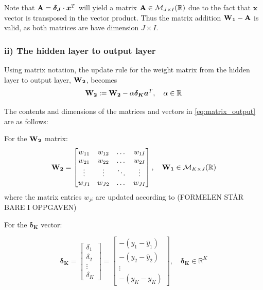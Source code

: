 \documentclass{article}
\begin{document}
Note that $\text{\textbf{A}} = \boldsymbol{\delta_J} \cdot \boldsymbol{x}^T$ will yield a matrix $\text{\textbf{A}} \in \mathcal{M}_{J \times I}(\mathbb{R})$ due to the fact that $\boldsymbol{x}$ vector is transposed in the vector product. Thus the matrix addition $\text{\textbf{W}}_\textbf{1} - \text{\textbf{A}}$ is valid, as both matrices are have dimension $J \times I$.  


\subsubsection*{ii) The hidden layer to output layer} 
Using matrix notation, the update rule for the weight matrix from the hidden layer to output layer, $\text{\textbf{W}}_\textbf{2}$, becomes 
\begin{equation}
    \text{\textbf{W}}_\textbf{2} := \text{\textbf{W}}_\textbf{2} - \alpha \boldsymbol{\delta_K} \boldsymbol{a}^T,\quad \alpha \in \mathbb{R}
    \label{eq:matrix_output}
\end{equation}

The contents and dimensions of the matrices and vectors in \eqref{eq:matrix_output} are as follows: 


For the $\text{\textbf{W}}_\textbf{2}$ matrix:
\begin{equation}
    \text{\textbf{W}}_\textbf{2} =
    \begin{bmatrix}
        w_{11} & w_{12}& \dots & w_{1I} \\
         w_{21} & w_{22}& \dots & w_{2I} \\
        \vdots & \vdots & \ddots & \vdots \\
         w_{J1} & w_{J2}& \dots & w_{JI} \\
    \end{bmatrix}
    , \quad \text{\textbf{W}}_\textbf{1} \in \mathcal{M}_{K \times J}(\mathbb{R})
\end{equation}
where the matrix entries $w_{ji}$ are updated according to (FORMELEN STÅR BARE I OPPGAVEN)



For the $\boldsymbol{\delta_K}$ vector:

\begin{equation}
    \boldsymbol{\delta_K} = 
    \begin{bmatrix}
        \delta_1 \\
        \delta_2 \\
        \vdots \\
        \delta_K
    \end{bmatrix}
    = \begin{bmatrix}
        -(y_1 - \hat{y}_1) \\
        -(y_2 - \hat{y}_2)\\
        \vdots \\
        -(y_K - \hat{y}_K)
    \end{bmatrix}
    , \quad \boldsymbol{\delta_K} \in \mathbb{R}^K
\end{equation}
\end{document}
